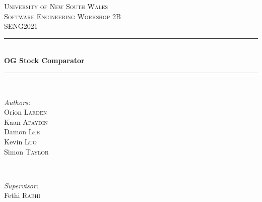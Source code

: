 \documentclass[11pt]{article}
\numberwithin{figure}{section}
\begin{document}


\begin{titlepage}

\newcommand{\HRule}{\rule{\linewidth}{0.5mm}} %

\center %
 

\textsc{\LARGE University of New South Wales}\\[1.5cm] %
\textsc{\Large Software Engineering Workshop 2B}\\[0.5cm] %
\textsc{\large SENG2021}\\[0.5cm] %


\HRule \\[0.4cm]
{ \huge \bfseries OG Stock Comparator}\\[0.175cm] %
\HRule \\[1.5cm]
 

\begin{minipage}{0.4\textwidth}
\begin{flushleft} \large
\emph{Authors:}\\
Orion \textsc{Larden} \\
Kaan \textsc{Apaydin} \\
Damon \textsc{Lee} \\
Kevin \textsc{Luo} \\
Simon \textsc{Taylor} \\
\end{flushleft}
\end{minipage}
~
\begin{minipage}{0.4\textwidth}
\begin{flushright} \large
\emph{Supervisor:} \\
Fethi \textsc{Rabhi} %
\end{flushright}
\end{minipage}\\[1cm]




\end{titlepage}
\end{document}
